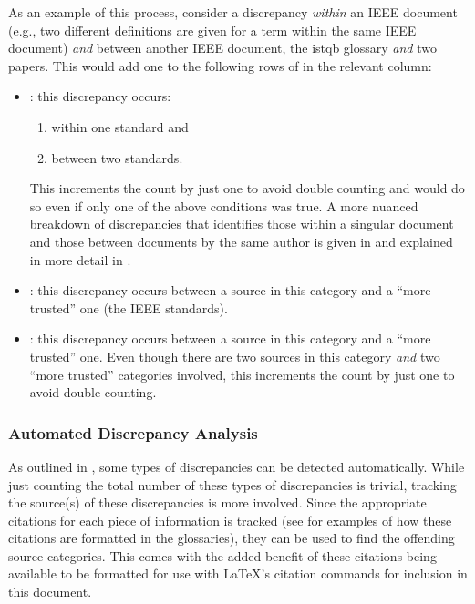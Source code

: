 \label{discrep-analysis-example}
As an example of this process, consider a discrepancy \emph{within} an IEEE
document (e.g., two different definitions are given for a term within the same
IEEE document) \emph{and} between another IEEE document, the \acs{istqb}
glossary \emph{and} two papers. This would add one to the
following rows of  in the relevant column:

\begin{itemize}
    \item \textbf{\stds{}}: this discrepancy occurs:
          \begin{enumerate}
              \item within one standard and
              \item between two standards.
          \end{enumerate}
          This increments the count by just one to avoid double counting and
          would do so even if only one of the above conditions was true. A more
          nuanced breakdown of discrepancies that identifies those within a
          singular document and those between documents by the same author is
          given in  and explained in more detail in
          .
    \item \textbf{\metas{}}: this discrepancy occurs between a
          source in this category and a ``more trusted'' one
          (the IEEE standards).
    \item \textbf{\papers{}}: this discrepancy occurs between a
          source in this category and a ``more trusted'' one. Even though there
          are two sources in this category \emph{and} two ``more trusted''
          categories involved, this increments the count by just one to avoid
          double counting.
\end{itemize}

\subsubsection{Automated Discrepancy Analysis}
\label{auto-discrep-analysis}

As outlined in , some types of discrepancies can be detected
automatically. While just counting the total number of these types of
discrepancies is trivial, tracking the source(s) of these discrepancies is more
involved. Since the appropriate citations for each piece of information is
tracked (see  for examples of
how these citations are formatted in the glossaries), they can be used to find
the offending source categories. This comes with the added benefit of these
citations being available to be formatted for use with \LaTeX{}'s citation
commands for inclusion in this document.

